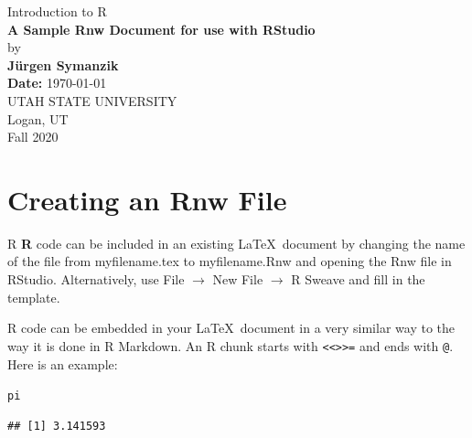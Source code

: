 \documentclass[12pt]{article}\usepackage[]{graphicx}\usepackage[]{xcolor}
\makeatletter
\newcommand{\hlstd}[1]{\textcolor[rgb]{0.345,0.345,0.345}{#1}}%
\newenvironment{kframe}{%
 \def\at@end@of@kframe{}%
 \ifinner\ifhmode%
  \def\at@end@of@kframe{\end{minipage}}%
  \begin{minipage}{\columnwidth}%
 \fi\fi%
 \def\FrameCommand##1{\hskip\@totalleftmargin \hskip-\fboxsep
 \colorbox{shadecolor}{##1}\hskip-\fboxsep
     \hskip-\linewidth \hskip-\@totalleftmargin \hskip\columnwidth}%
 \MakeFramed {\advance\hsize-\width
   \@totalleftmargin\z@ \linewidth\hsize
   \@setminipage}}%
 {\par\unskip\endMakeFramed%
 \at@end@of@kframe}
\newenvironment{knitrout}{}{} %
\makeatother
\begin{document}
\begin{titlepage}

\begin{center}
{\large Introduction to R} \\[1.5in]

{\LARGE \bf A Sample Rnw Document for use with RStudio} \\[.4in]
by \\[.4in]
{\bf J\"urgen Symanzik} \\[1in]
{\bf Date:} \today \\[.8in]

UTAH STATE UNIVERSITY \\[.2in]
Logan, UT \\[0.2in]
Fall 2020 \\[0.2in]
\end{center}

\thispagestyle{empty}
\vfill
\end{titlepage}


\newpage 


\tableofcontents


\newpage


\section{Creating an Rnw File}

R \textbf{R} code can be included in an existing \LaTeX\ document by changing the name of the file from myfilename.tex to myfilename.Rnw and opening the Rnw file in RStudio.  Alternatively, use File $\rightarrow$ New File $\rightarrow$ R Sweave and fill in the template. 

R code can be embedded in your \LaTeX\ document in a very similar way to the way it is done in R Markdown. An R chunk starts with \verb|<<>>=| and  ends with \verb|@|.
Here is an example:

\begin{knitrout}
\color{fgcolor}\begin{kframe}
\begin{alltt}
\hlstd{pi}
\end{alltt}
\begin{verbatim}
## [1] 3.141593
\end{verbatim}
\end{kframe}
\end{knitrout}
\end{document}
